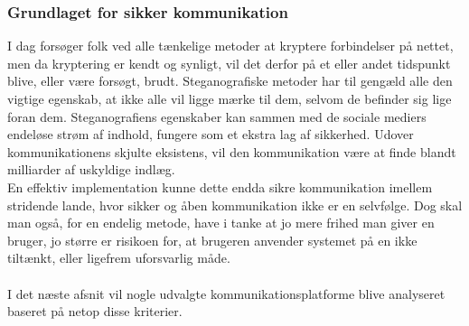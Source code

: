 \subsubsection{Grundlaget for sikker kommunikation}
I dag forsøger folk ved alle tænkelige metoder at kryptere forbindelser på nettet, men da kryptering er kendt og synligt, vil det derfor på et eller andet tidspunkt blive, eller være forsøgt, brudt. Steganografiske metoder har til gengæld alle den vigtige egenskab, at ikke alle vil ligge mærke til dem, selvom de befinder sig lige foran dem. Steganografiens egenskaber kan sammen med de sociale mediers endeløse strøm af indhold, fungere som et ekstra lag af sikkerhed. Udover kommunikationens skjulte eksistens, vil den kommunikation være at finde blandt milliarder af uskyldige indlæg.\\
En effektiv implementation kunne dette endda sikre kommunikation imellem stridende lande, hvor sikker og åben kommunikation ikke er en selvfølge.
Dog skal man også, for en endelig metode, have i tanke at jo mere frihed man giver en bruger, jo større er risikoen for, at brugeren anvender systemet på en ikke tiltænkt, eller ligefrem uforsvarlig måde.
\\\\
I det næste afsnit vil nogle udvalgte kommunikationsplatforme blive analyseret baseret på netop disse kriterier.